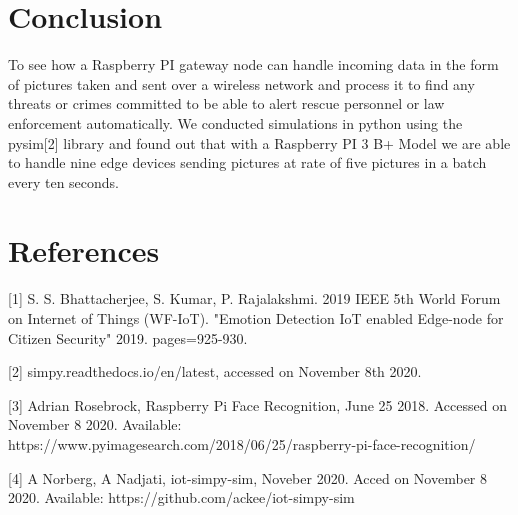 \documentclass[a4paper,11pt,notitlepage,twocolumn]{article}
\begin{document}
  \section{Conclusion}
    To see how a Raspberry PI gateway node can handle incoming data in the form of
    pictures taken and sent over a wireless network and process it to find
    any threats or crimes committed to be able to alert rescue personnel or
    law enforcement automatically. We conducted simulations in python using
    the pysim[2] library and found out that with a Raspberry PI 3 B+ Model
    we are able to handle nine edge devices sending pictures at rate of five
    pictures in a batch every ten seconds.
    
  \section{References}
    {[1] S. S. Bhattacherjee, S. Kumar, P. Rajalakshmi. 2019 IEEE 5th World Forum on Internet
    of Things (WF-IoT). "Emotion Detection IoT enabled Edge-node for Citizen Security" 2019. pages=925-930.\par}
    {[2] simpy.readthedocs.io/en/latest, accessed on November 8th 2020.\par}
    {[3] Adrian Rosebrock, Raspberry Pi Face Recognition, June 25 2018. Accessed on November 8 2020. Available:
    https://www.pyimagesearch.com/2018/06/25/raspberry-pi-face-recognition/\par}
    {[4] A Norberg, A Nadjati, iot-simpy-sim, Noveber 2020. Acced on November 8 2020. Available:
    https://github.com/ackee/iot-simpy-sim\par}

  \onecolumn
\end{document}

